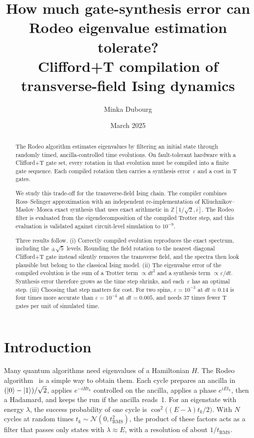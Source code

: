 \documentclass[10pt,a4paper]{article}
\title{\textbf{How much gate-synthesis error can Rodeo eigenvalue estimation tolerate?}\\[2pt]
\large Clifford+T compilation of transverse-field Ising dynamics}
\author{Minka Dubourg}
\date{March 2025}
\begin{document}
\maketitle

\begin{abstract}
\noindent
The Rodeo algorithm estimates eigenvalues by filtering an initial state through randomly timed, ancilla-controlled time evolutions. On fault-tolerant hardware with a Clifford+T gate set, every rotation in that evolution must be compiled into a finite gate sequence. Each compiled rotation then carries a synthesis error~$\varepsilon$ and a cost in T gates.

We study this trade-off for the transverse-field Ising chain. The compiler combines Ross--Selinger approximation with an independent re-implementation of Kliuchnikov--Maslov--Mosca exact synthesis that uses exact arithmetic in $\mathbb Z[1/\sqrt2,i]$. The Rodeo filter is evaluated from the eigendecomposition of the compiled Trotter step, and this evaluation is validated against circuit-level simulation to $10^{-9}$.

Three results follow.
(i) Correctly compiled evolution reproduces the exact spectrum, including the $\pm\sqrt5$ levels. Rounding the field rotation to the nearest diagonal Clifford+T gate instead silently removes the transverse field, and the spectra then look plausible but belong to the classical Ising model.
(ii) The eigenvalue error of the compiled evolution is the sum of a Trotter term $\propto dt^2$ and a synthesis term $\propto\varepsilon/dt$. Synthesis error therefore grows as the time step shrinks, and each~$\varepsilon$ has an optimal step.
(iii) Choosing that step matters for cost. For two spins, $\varepsilon=10^{-3}$ at $dt\approx0.14$ is four times more accurate than $\varepsilon=10^{-4}$ at $dt=0.005$, and needs 37 times fewer T gates per unit of simulated time.
\end{abstract}

\section{Introduction}
Many quantum algorithms need eigenvalues of a Hamiltonian $H$. The Rodeo algorithm~\cite{rodeo} is a simple way to obtain them. Each cycle prepares an ancilla in $(\ket0-\ket1)/\sqrt2$, applies $e^{-iHt_k}$ controlled on the ancilla, applies a phase $e^{iEt_k}$, then a Hadamard, and keeps the run if the ancilla reads~1. For an eigenstate with energy $\lambda$, the success probability of one cycle is $\cos^2\!\big((E-\lambda)t_k/2\big)$. With $N$ cycles at random times $t_k\sim\mathcal N(0,t_\mathrm{RMS}^2)$, the product of these factors acts as a filter that passes only states with $\lambda\approx E$, with a resolution of about $1/t_\mathrm{RMS}$.
\end{document}
